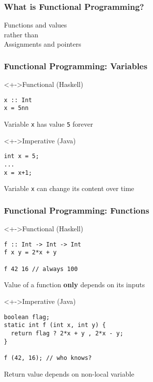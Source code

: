 \documentclass{beamer}
\begin{document}
\begin{frame}
  \frametitle{What is Functional Programming?}
  \begin{LARGE}
    \begin{center}
      Functions and values
      \\[4ex]
      rather than
      \\[4ex]
      Assignments and pointers
    \end{center}
  \end{LARGE}
\end{frame}

\begin{frame}[fragile]
  \frametitle{Functional Programming: Variables}
  \begin{block}<+->{Functional (Haskell)}
\begin{verbatim}
x :: Int
x = 5nn
\end{verbatim}
    Variable \texttt{x} has value \texttt{5} forever
  \end{block}
  \begin{block}<+->{Imperative (Java)}
\begin{verbatim}
int x = 5;
...
x = x+1;
\end{verbatim}
    Variable \texttt{x} can change its content over time
  \end{block}
\end{frame}

\begin{frame}[fragile]
  \frametitle{Functional Programming: Functions}
  \begin{block}<+->{Functional (Haskell)}
\begin{verbatim}
f :: Int -> Int -> Int
f x y = 2*x + y

f 42 16 // always 100
\end{verbatim}
    Value of a function \textbf{only} depends on its inputs
  \end{block}
  \begin{block}<+->{Imperative (Java)}
\begin{verbatim}
boolean flag;
static int f (int x, int y) {
  return flag ? 2*x + y , 2*x - y;
}

f (42, 16); // who knows?
\end{verbatim}
    Return value  depends on non-local variable
  \end{block}
\end{frame}
\end{document}
